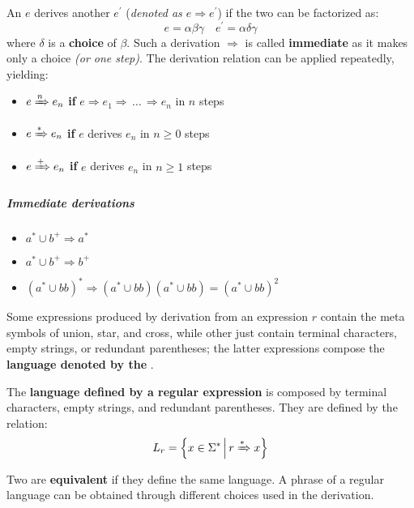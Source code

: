 \documentclass[english]{article}
\begin{document}
An \re \(e\) derives another \re \(e^\prime\) (\textit{denoted as \(e \Rightarrow e^\prime\)}) if the two \re can be factorized as:
\[ e = \alpha\beta\gamma \quad e^\prime = \alpha\delta\gamma \]
where \(\delta\) is a \textbf{choice} of \(\beta\).
Such a derivation \(\Rightarrow\) is called \textbf{immediate} as it makes only a choice \textit{(or one step)}.
The derivation relation can be applied repeatedly, yielding:

\begin{itemize}
  \item \(e \xRightarrow{n} e_n\) \textbf{if} \(e \Rightarrow e_1 \Rightarrow \,\ldots\, \Rightarrow e_n\) in \(n\) steps
  \item \(e \xRightarrow{\ast} e_n\) \textbf{if} \(e\) derives \(e_n\) in \(n \geq 0\) steps
  \item \(e \xRightarrow{+} e_n\) \textbf{if} \(e\) derives \(e_n\) in \(n \geq 1\) steps
\end{itemize}

\subparagraph*{Immediate derivations}

\begin{itemize}
  \item \(a^\ast \cup b^+ \Rightarrow a^\ast\)
  \item \(a^\ast \cup b^+ \Rightarrow b^+\)
  \item \(\left(a^\ast \cup b b\right)^\ast \Rightarrow \left(a^\ast \cup bb\right) \left(a^\ast \cup bb\right) = \left(a^\ast \cup bb \right)^2\)
\end{itemize}

\bigskip
Some expressions produced by derivation from an expression \(r\) contain the meta symbols of union, star, and cross, while
other just contain terminal characters, empty strings, or redundant parentheses;
the latter expressions compose the \textbf{language denoted by the \re}.

\begin{definition}
  The \textbf{language defined by a regular expression} is composed by terminal characters, empty strings, and redundant parentheses.
  They are defined by the relation:
  \[ L_r = \left\{x \in \Sigma^\ast \,\middle\vert\, r \xRightarrow{\ast} x \right\} \]
\end{definition}

\begin{definition}
  Two \re are \textbf{equivalent} if they define the same language.
  A phrase of a regular language can be obtained through different choices used in the derivation.
\end{definition}
\end{document}
